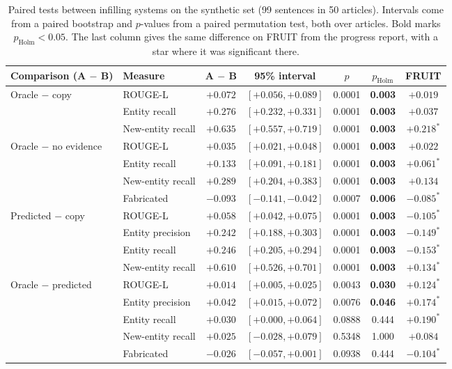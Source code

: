 \documentclass[]{paper}
\begin{document}
\begin{table}[H]
\caption{Paired tests between infilling systems on the synthetic set (99 sentences in 50 articles). Intervals come from a paired bootstrap and $p$-values from a paired permutation test, both over articles. Bold marks $p_{\text{Holm}} < 0.05$. The last column gives the same difference on FRUIT from the progress report, with a star where it was significant there.}
\label{tab:tests}
\centering
\footnotesize
\setlength{\tabcolsep}{4pt}
\begin{tabular}{llccccc}
\toprule
Comparison (A $-$ B) & Measure & A $-$ B & 95\% interval & $p$ & $p_{\text{Holm}}$ & FRUIT \\
\midrule
Oracle $-$ copy & ROUGE-L & $+0.072$ & $[+0.056, +0.089]$ & 0.0001 & \textbf{0.003} & $+0.019$ \\
 & Entity recall & $+0.276$ & $[+0.232, +0.331]$ & 0.0001 & \textbf{0.003} & $+0.037$ \\
 & New-entity recall & $+0.635$ & $[+0.557, +0.719]$ & 0.0001 & \textbf{0.003} & $+0.218^{*}$ \\
\midrule
Oracle $-$ no evidence & ROUGE-L & $+0.035$ & $[+0.021, +0.048]$ & 0.0001 & \textbf{0.003} & $+0.022$ \\
 & Entity recall & $+0.133$ & $[+0.091, +0.181]$ & 0.0001 & \textbf{0.003} & $+0.061^{*}$ \\
 & New-entity recall & $+0.289$ & $[+0.204, +0.383]$ & 0.0001 & \textbf{0.003} & $+0.134$ \\
 & Fabricated & $-0.093$ & $[-0.141, -0.042]$ & 0.0007 & \textbf{0.006} & $-0.085^{*}$ \\
\midrule
Predicted $-$ copy & ROUGE-L & $+0.058$ & $[+0.042, +0.075]$ & 0.0001 & \textbf{0.003} & $-0.105^{*}$ \\
 & Entity precision & $+0.242$ & $[+0.188, +0.303]$ & 0.0001 & \textbf{0.003} & $-0.149^{*}$ \\
 & Entity recall & $+0.246$ & $[+0.205, +0.294]$ & 0.0001 & \textbf{0.003} & $-0.153^{*}$ \\
 & New-entity recall & $+0.610$ & $[+0.526, +0.701]$ & 0.0001 & \textbf{0.003} & $+0.134^{*}$ \\
\midrule
Oracle $-$ predicted & ROUGE-L & $+0.014$ & $[+0.005, +0.025]$ & 0.0043 & \textbf{0.030} & $+0.124^{*}$ \\
 & Entity precision & $+0.042$ & $[+0.015, +0.072]$ & 0.0076 & \textbf{0.046} & $+0.174^{*}$ \\
 & Entity recall & $+0.030$ & $[+0.000, +0.064]$ & 0.0888 & 0.444 & $+0.190^{*}$ \\
 & New-entity recall & $+0.025$ & $[-0.028, +0.079]$ & 0.5348 & 1.000 & $+0.084$ \\
 & Fabricated & $-0.026$ & $[-0.057, +0.001]$ & 0.0938 & 0.444 & $-0.104^{*}$ \\
\bottomrule
\end{tabular}
\end{table}
\end{document}

